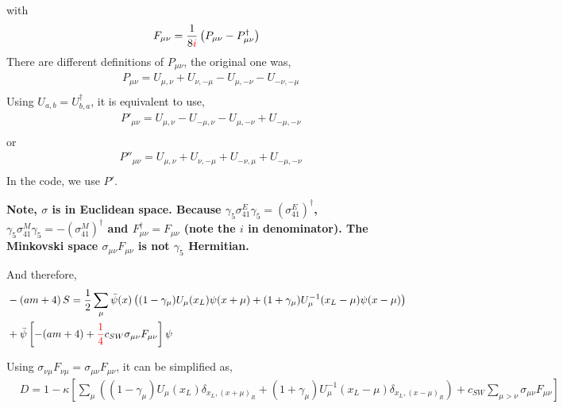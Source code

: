 with
\begin{equation}
\begin{split}
&F_{\mu\nu}=\frac{1}{8\textcolor[rgb]{1,0,0}{i}}\left(P_{\mu\nu}-P_{\mu\nu}^{\dagger}\right)\\
\end{split}
\end{equation}
There are different definitions of $P_{\mu\nu}$, the original one was,
\begin{equation}
\begin{split}
&P_{\mu\nu}=U_{\mu,\nu}+U_{\nu,-\mu}-U_{\mu,-\nu}-U_{-\nu,-\mu}\\
\end{split}
\end{equation}
Using $U_{a,b}=U_{b,a}^{\dagger}$, it is equivalent to use,
\begin{equation}
\begin{split}
&P'_{\mu\nu}=U_{\mu,\nu}-U_{-\mu,\nu}-U_{\mu,-\nu}+U_{-\mu,-\nu}\\
\end{split}
\end{equation}
or
\begin{equation}
\begin{split}
&P''_{\mu\nu}=U_{\mu,\nu}+U_{\nu,-\mu}+U_{-\nu,\mu}+U_{-\mu,-\nu}\\
\end{split}
\end{equation}
In the code, we use $P'$.

\textbf{Note, $\sigma$ is in Euclidean space. Because $\gamma _5 \sigma ^E_{41}\gamma _5 = \left(\sigma ^E_{41}\right)^{\dagger}$, $\gamma _5 \sigma ^M_{41}\gamma _5 = -\left(\sigma ^M_{41}\right)^{\dagger}$ and $F_{\mu\nu}^{\dagger}=F_{\mu\nu}$ (note the $i$ in denominator). \textcolor[rgb]{1,0,0}{The Minkovski space $\sigma _{\mu\nu}F_{\mu\nu}$ is not $\gamma _5$ Hermitian.}}

And therefore,
\begin{equation}
\begin{split}
&-\left(am + 4\right)S=\frac{1}{2}\sum _{\mu}\bar{\psi}(x)\left((1-\gamma _{\mu})U_{\mu}(x _L)\psi(x+\mu)+(1+\gamma _{\mu})U_{\mu}^{-1}(x _L-\mu)\psi (x-\mu)\right)\\    
&+\bar{\psi}\left[-(am+4) + \textcolor[rgb]{1,0,0}{\frac{1}{4}}c_{SW}\sigma_{\mu\nu}F_{\mu\nu}\right]\psi\\
\end{split}
\end{equation}

Using $\sigma _{\nu\mu}F_{\nu\mu}=\sigma _{\mu\nu}F_{\mu\nu}$, it can be simplified as,
\begin{equation}
\begin{split}
&D=1-\kappa\left[\sum _{\mu}\left((1-\gamma _{\mu})U_{\mu}(x _L)\delta _{x _L,(x+\mu)_R}+(1+\gamma _{\mu})U_{\mu}^{-1}(x _L-\mu)\delta _{x_L,(x-\mu)_R}\right)+c_{SW}\sum _{\mu>\nu}\sigma_{\mu\nu}F_{\mu\nu}\right]\\
\end{split}
\end{equation}

